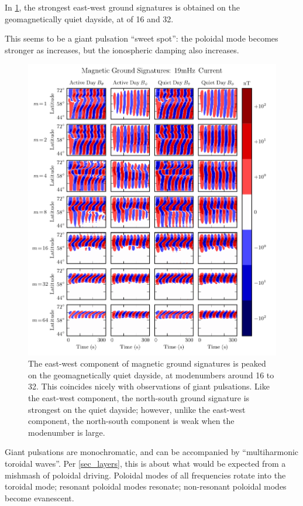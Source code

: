 In \cref{fig_ground_signatures}, the strongest east-west ground signatures is obtained on the geomagnetically quiet dayside, at \azm of 16 and 32. 

This seems to be a giant pulsation ``sweet spot'': the poloidal mode becomes stronger as \azm increases, but the ionospheric damping also increases. 

\begin{figure}[H]
    \centering
    \includegraphics[width=\textwidth]{figures/ground_19mHz.pdf}
    \caption[Dayside Ground Magnetic Fields]{
      The east-west component of magnetic ground signatures is peaked on the geomagnetically quiet dayside, at modenumbers around 16 to 32. This coincides nicely with observations of giant pulsations. Like the east-west component, the north-south ground signature is strongest on the quiet dayside; however, unlike the east-west component, the north-south component is weak when the modenumber is large. 
    }
    \label{fig_ground_signatures}
\end{figure}

Giant pulsations are monochromatic, and can be accompanied by ``multiharmonic toroidal waves''\cite{takahashi_2011}. Per \cref{sec_layers}, this is about what would be expected from a mishmash of poloidal driving. Poloidal modes of all frequencies rotate into the toroidal mode; resonant poloidal modes resonate; non-resonant poloidal modes become evanescent. 

